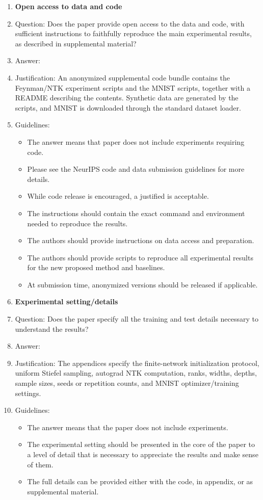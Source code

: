 \documentclass{article}
\begin{document}
\begin{enumerate}[leftmargin=1.5em]
\item {\bf Open access to data and code}
    \item[] Question: Does the paper provide open access to the data and code, with sufficient instructions to faithfully reproduce the main experimental results, as described in supplemental material?
    \item[] Answer: \answerYes{}
    \item[] Justification: An anonymized supplemental code bundle contains the Feynman/NTK experiment scripts and the MNIST scripts, together with a README describing the contents. Synthetic data are generated by the scripts, and MNIST is downloaded through the standard dataset loader.
    \item[] Guidelines:
    \begin{itemize}
        \item The answer \answerNA{} means that paper does not include experiments requiring code.
        \item Please see the NeurIPS code and data submission guidelines for more details.
        \item While code release is encouraged, a justified \answerNo{} is acceptable.
        \item The instructions should contain the exact command and environment needed to reproduce the results.
        \item The authors should provide instructions on data access and preparation.
        \item The authors should provide scripts to reproduce all experimental results for the new proposed method and baselines.
        \item At submission time, anonymized versions should be released if applicable.
    \end{itemize}

\item {\bf Experimental setting/details}
    \item[] Question: Does the paper specify all the training and test details necessary to understand the results?
    \item[] Answer: \answerYes{}
    \item[] Justification: The appendices specify the finite-network initialization protocol, uniform Stiefel sampling, autograd NTK computation, ranks, widths, depths, sample sizes, seeds or repetition counts, and MNIST optimizer/training settings.
    \item[] Guidelines:
    \begin{itemize}
        \item The answer \answerNA{} means that the paper does not include experiments.
        \item The experimental setting should be presented in the core of the paper to a level of detail that is necessary to appreciate the results and make sense of them.
        \item The full details can be provided either with the code, in appendix, or as supplemental material.
    \end{itemize}


\end{enumerate}
\end{document}
